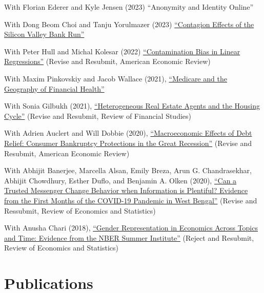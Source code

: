 \documentclass[letterpaper]{article}
\renewenvironment{itemize}{
  \begin{list}{}
    { \setlength{\itemsep}{5pt}
      \setlength{\parsep}{0pt}
      \setlength{\topsep}{0pt}
      \setlength{\leftmargin}{0em} } }{
  \end{list}}
\begin{document}
\begin{itemize}
\item With Florian Ederer and Kyle Jensen (2023) ``Anonymity and Identity Online''
\item With Dong Beom Choi and Tanju Yorulmazer (2023) \href{https://arxiv.org/pdf/2308.06642.pdf}{``Contagion Effects of the Silicon Valley Bank Run''}
\item With Peter Hull and Michal Kolesar (2022) \href{https://arxiv.org/abs/2106.05024}{``Contamination Bias in Linear Regressions''} (Revise and Resubmit, American Economic Review)
\item With Maxim Pinkovskiy and Jacob Wallace (2021), \href{http://paulgp.github.io/papers/GPW_compressed.pdf}{``Medicare and the Geography of Financial Health''}
\item With Sonia Gilbukh (2021), \href{http://paulgp.github.io/papers/Heterogeneous_Real_Estate_Agents_and_the_Housing_Cycle.pdf}{``Heterogeneous Real Estate Agents and the Housing Cycle''} (Revise and Resubmit, Review of Financial Studies)
\item With Adrien Auclert and Will Dobbie (2020), \href{http://paulgp.github.io/papers/Macroeconomic_Effects_of_Debt_Relief_Posting_342019.pdf}{``Macroeconomic Effects of Debt Relief: Consumer Bankruptcy Protections in the Great Recession''} (Revise and Resubmit, American Economic Review)
\item With  Abhijit Banerjee, Marcella Alsan, Emily Breza, Arun G. Chandrasekhar, Abhijit Chowdhury, Esther Duflo, and Benjamin A. Olken (2020), \href{https://economics.mit.edu/sites/default/files/2022-08/wb_manuscript_final.pdf}{``Can a Trusted Messenger Change Behavior when Information is Plentiful? Evidence from the First Months of the COVID-19 Pandemic in West Bengal''}  (Revise and Ressubmit, Review of Economics and Statistics)
\item With Anusha Chari (2018), \href{http://paulgp.github.io/papers/cgp_nbergender.pdf}{``Gender Representation in Economics Across Topics and Time: Evidence from the NBER Summer Institute''} (Reject and Resubmit, Review of Economics and Statistics)
\end{itemize}

\section*{Publications}
\end{document}
